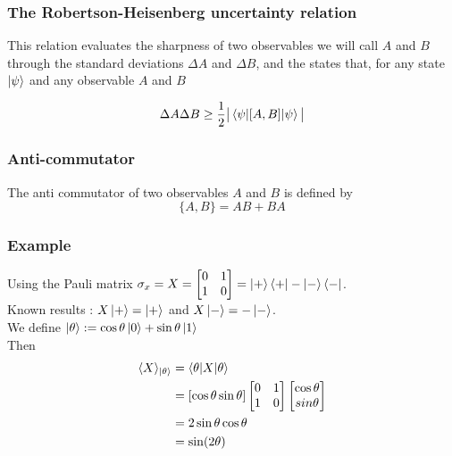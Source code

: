 \documentclass{article}
\begin{document}
\subsubsection*{The Robertson-Heisenberg uncertainty relation}
This relation evaluates the sharpness of two observables we will call $A$ and
$B$ through the standard deviations $\Delta A$ and $\Delta B$, and the states
that, for any state $\ket{\psi}$ and any observable $A$ and $B$

\begin{equation}
    \Delta A \Delta B \geq \frac{1}{2}\big|\braket{\psi|[A,B]|\psi}\big|
\end{equation}

\subsubsection*{Anti-commutator}
The anti commutator of two observables $A$ and $B$ is defined by
\begin{equation}
    \{A,B\} = AB+BA
\end{equation}

\subsubsection*{Example}
Using the Pauli matrix $\sigma_x = X =
    \begin{bmatrix}
    0 & 1 \\
    1 & 0
    \end{bmatrix}
    = \ket{+}\bra{+} - \ket{-}\bra{-} $. \\\noindent Known results : $X\ket{+} =
    \ket{+}$ and $X\ket{-}=-\ket{-}$. \\\noindent We define
    $\ket{\theta}:=\cos\theta\ket{0}+\sin\theta\ket{1}$ \\\noindent Then
\begin{equation}
    \begin{aligned}
        \langle X \rangle_{\ket{\theta}}
            & = \braket{\theta | X |\theta} \\
            & = [\cos \theta \sin \theta]
                \begin{bmatrix}0 & 1 \\ 1 & 0 \end{bmatrix}
                \begin{bmatrix} \cos \theta\\ sin \theta \end{bmatrix} \\
            & = 2 \sin\theta\cos\theta \\
            & = \sin (2\theta)
    \end{aligned}
\end{equation}
\end{document}
